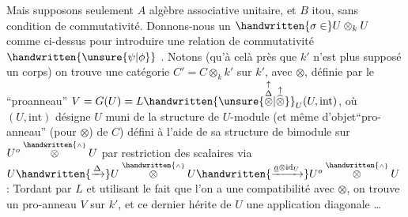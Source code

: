 Mais supposons seulement $A$ algèbre associative unitaire, et $B$ itou, sans condition de commutativité. Donnons-nous un $\handwritten{\sigma\in}U\otimes_k U$  comme ci-dessus pour introduire une relation de commutativité $\handwritten{\unsure{\psi|\phi}}$ . Notons (qu'à celà près que $k'$ n'est plus supposé un corps) on trouve une catégorie $C'=C\otimes_k k'$ sur $k'$, avec $\otimes$, définie par le ``proanneau'' $V=G(U)=L\handwritten{\unsure{\overset{\uparrow}{\overset{\Delta}{\otimes}}|\overset{\uparrow}{\widehat{\otimes}}}}_U(U,\mathrm{int})$, où $(U,\mathrm{int})$ désigne $U$ muni de la structure de $U$-module  (et même d'objet``pro-anneau'' (pour $\otimes$) de $C$) défini à l'aide de sa structure de bimodule sur $U^o\overset{\handwritten{\scriptscriptstyle\wedge}}{\otimes} U$  par restriction des scalaires via $U\handwritten{\xrightarrow{\Delta}}U\overset{\handwritten{\scriptscriptstyle\wedge}}{\otimes} U\handwritten{\xrightarrow{\underline a\otimes\mathrm{id}_U}}U^o\overset{\handwritten{\scriptscriptstyle\wedge}}{\otimes} U$ : Tordant par $L$ et utilisant le fait que l'on a une compatibilité avec $\otimes$, on trouve un pro-anneau $V$ sur $k'$, et ce dernier hérite de $U$ une application diagonale \ldots
{}
